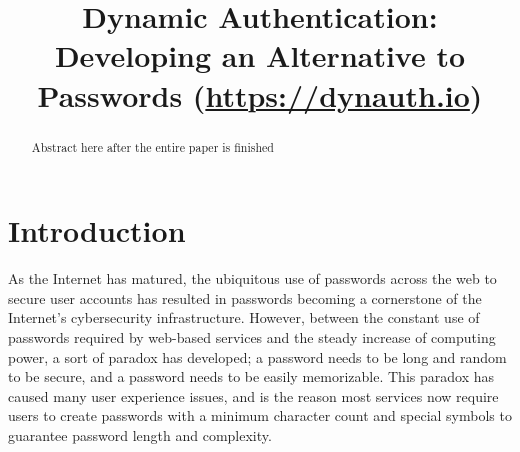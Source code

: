 \documentclass[conference]{IEEEtran}
\begin{document}
\title{Dynamic Authentication: Developing an Alternative to Passwords (\url{https://dynauth.io})\\}

\author{
\and
{}
\and
{}
}

\maketitle

\begin{abstract}
	Abstract here after the entire paper is finished
\end{abstract}


\section{Introduction}
	As the Internet has matured, the ubiquitous use of passwords across the web to secure user accounts has resulted in passwords becoming a cornerstone of the Internet’s cybersecurity infrastructure. However, between the constant use of passwords required by web-based services and the steady increase of computing power, a sort of paradox has developed; a password needs to be long and random to be secure, and a password needs to be easily memorizable. This paradox has caused many user experience issues, and is the reason most services now require users to create passwords with a minimum character count and special symbols to guarantee password length and complexity. 
	
\end{document}
